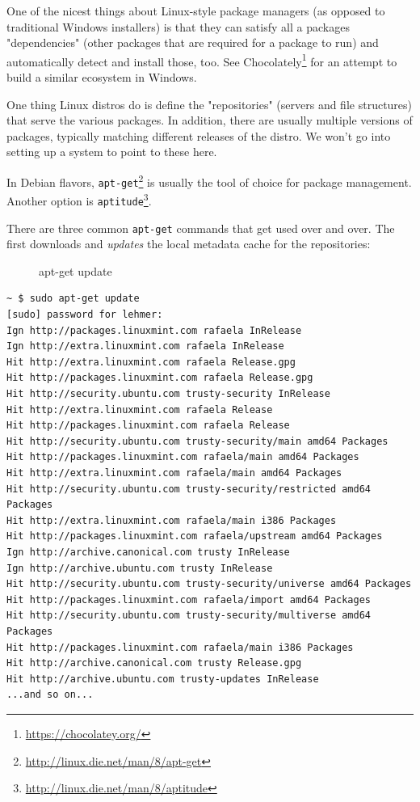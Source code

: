 \documentclass[10pt,]{book}
\renewcommand{\href}[2]{#2\footnote{\url{#1}}}
\numberwithin{figure}{chapter}
\DeclareRobustCommand{\drcap}[1]{\begin{figure}[H]\caption{#1}\end{figure}}
\DeclareRobustCommand{\drcmd}[1]{\index{Commands!#1}}
\begin{document}
One of the nicest things about Linux-style package managers (as opposed
to traditional Windows installers) is that they can satisfy all a
packages "dependencies" (other packages that are required for a package
to run) and automatically detect and install those, too. See
\href{https://chocolatey.org/}{Chocolately} for an attempt to build a
similar ecosystem in Windows.

One thing Linux distros do is define the "repositories" (servers and
file structures) that serve the various packages. In addition, there are
usually multiple versions of packages, typically matching different
releases of the distro. We won't go into setting up a system to point to
these here.

In Debian flavors,
\href{http://linux.die.net/man/8/apt-get}{\texttt{apt-get}}\drcmd{apt-get}
is usually the tool of choice for package management. Another option is
\href{http://linux.die.net/man/8/aptitude}{\texttt{aptitude}}\drcmd{aptitude}.

There are three common \texttt{apt-get} commands that get used over and
over. The first downloads and \emph{updates} the local metadata cache
for the repositories:

\drcap{apt-get update}

\begin{verbatim}
~ $ sudo apt-get update
[sudo] password for lehmer:
Ign http://packages.linuxmint.com rafaela InRelease
Ign http://extra.linuxmint.com rafaela InRelease
Hit http://extra.linuxmint.com rafaela Release.gpg                             
Hit http://packages.linuxmint.com rafaela Release.gpg                          
Hit http://security.ubuntu.com trusty-security InRelease                       
Hit http://extra.linuxmint.com rafaela Release
Hit http://packages.linuxmint.com rafaela Release
Hit http://security.ubuntu.com trusty-security/main amd64 Packages
Hit http://packages.linuxmint.com rafaela/main amd64 Packages
Hit http://extra.linuxmint.com rafaela/main amd64 Packages
Hit http://security.ubuntu.com trusty-security/restricted amd64 Packages
Hit http://extra.linuxmint.com rafaela/main i386 Packages
Hit http://packages.linuxmint.com rafaela/upstream amd64 Packages
Ign http://archive.canonical.com trusty InRelease
Ign http://archive.ubuntu.com trusty InRelease
Hit http://security.ubuntu.com trusty-security/universe amd64 Packages
Hit http://packages.linuxmint.com rafaela/import amd64 Packages
Hit http://security.ubuntu.com trusty-security/multiverse amd64 Packages
Hit http://packages.linuxmint.com rafaela/main i386 Packages
Hit http://archive.canonical.com trusty Release.gpg
Hit http://archive.ubuntu.com trusty-updates InRelease
...and so on...
\end{verbatim}
\end{document}

